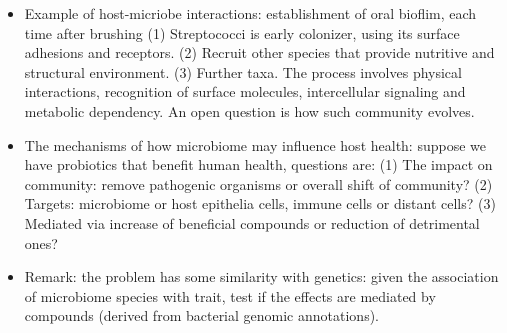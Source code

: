 \documentclass{report}
\begin{document}
\begin{itemize}
	\item Example of host-micriobe interactions: establishment of oral bioflim, each time after brushing (1) Streptococci is early colonizer, using its surface adhesions and receptors. (2) Recruit other species that provide nutritive and structural environment. (3) Further taxa. The process involves physical interactions, recognition of surface molecules, intercellular signaling and metabolic dependency. An open question is how such community evolves.
	
	\item The mechanisms of how microbiome may influence host health: suppose we have probiotics that benefit human health, questions are: (1) The impact on community: remove pathogenic organisms or overall shift of community? (2) Targets: microbiome or host epithelia cells, immune cells or distant cells? (3) Mediated via increase of beneficial compounds or reduction of detrimental ones?
	
	\item Remark: the problem has some similarity with genetics: given the association of microbiome species with trait, test if the effects are mediated by compounds (derived from bacterial genomic annotations).
\end{itemize}
\end{document}
